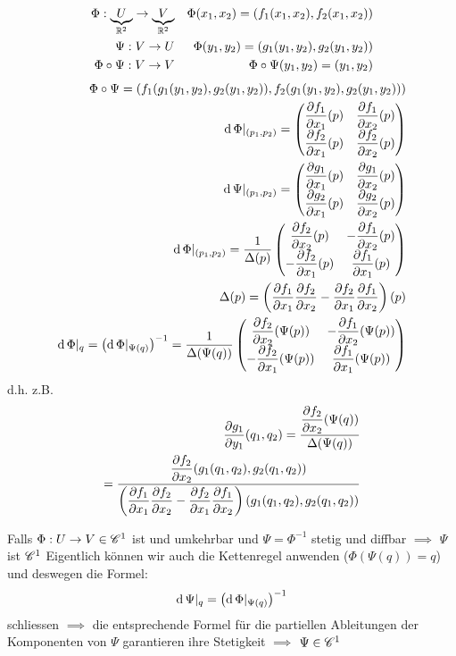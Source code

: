 \begin{Bsp}
  \begin{align*}
    \Phi:\underbrace{U}_{\mathbb{R}^{2}}\rightarrow\underbrace{V}_{\mathbb{R}^{2}} &&\Phi(x_1,x_2)=(f_1(x_1,x_2),f_2(x_1,x_2))\\
    \Psi:V\rightarrow U && \Phi(y_1,y_2)=(g_1(y_1,y_2),g_2(y_1,y_2))\\
    \Phi\circ\Psi:V\rightarrow V&&\Phi\circ\Psi(y_1,y_2)=(y_1,y_2)\\
  \end{align*}
  \begin{eqnarray*}
    \Phi\circ\Psi=(f_1(g_1(y_1,y_2),g_2(y_1,y_2)),f_2(g_1(y_1,y_2),g_2(y_1,y_2)))\\
    \operatorname{d}\Phi|_{(p_1,p_2)}= \begin{pmatrix}
      \dfrac{\partial f_1}{\partial x_1}(p) & \dfrac{\partial f_1}{\partial x_2}(p)\\
      \dfrac{\partial f_2}{\partial x_1}(p) & \dfrac{\partial f_2}{\partial x_2}(p)
    \end{pmatrix}\\
    \operatorname{d}\Psi|_{(p_1,p_2)}= \begin{pmatrix}
      \dfrac{\partial g_1}{\partial x_1}(p) & \dfrac{\partial g_1}{\partial x_2}(p)\\
      \dfrac{\partial g_2}{\partial x_1}(p) & \dfrac{\partial g_2}{\partial x_2}(p)
    \end{pmatrix}\\
    \operatorname{d}\Phi|_{(p_1,p_2)}= \frac{1}{\Delta(p)}\begin{pmatrix}
      \dfrac{\partial f_2}{\partial x_2}(p) & -\dfrac{\partial f_1}{\partial x_2}(p)\\
      -\dfrac{\partial f_2}{\partial x_1}(p) & \dfrac{\partial f_1}{\partial x_1}(p)
    \end{pmatrix}\\
    \Delta(p)= \left( \dfrac{\partial f_1}{\partial x_1} \dfrac{\partial f_2}{\partial x_2} -\dfrac{\partial f_2}{\partial x_1} \dfrac{\partial f_1}{\partial x_2} \right)(p)\\
    \operatorname{d}\Phi|_q=\left( \operatorname{d}\Phi|_{\Psi(q)} \right)^{-1}=\frac{1}{\Delta(\Psi(q))}\begin{pmatrix}
      \dfrac{\partial f_2}{\partial x_2}(\Psi(p)) & -\dfrac{\partial f_1}{\partial x_2}(\Psi(p))\\
      -\dfrac{\partial f_2}{\partial x_1}(\Psi(p)) & \dfrac{\partial f_1}{\partial x_1}(\Psi(p))
    \end{pmatrix}
  \end{eqnarray*}
  d.h. z.B.
  \begin{eqnarray*}
    \dfrac{\partial g_1}{\partial y_1}(q_1,q_2)=\frac{\dfrac{\partial f_2}{\partial x_2}(\Psi(q))}{\Delta(\Psi(q))}\\
    =\frac{\dfrac{\partial f_2}{\partial x_2}(g_1(q_1,q_2),g_2(q_1,q_2))}{\left( \dfrac{\partial f_1}{\partial x_1} \dfrac{\partial f_2}{\partial x_2} -\dfrac{\partial f_2}{\partial x_1} \dfrac{\partial f_1}{\partial x_2} \right)(g_1(q_1,q_2),g_2(q_1,q_2))}
  \end{eqnarray*}
\end{Bsp}
\begin{Bem}
  Falls $\Phi:U\rightarrow V\in\mathscr{C}^1$ ist und umkehrbar und $\Psi=\Phi^{-1}$ stetig und diffbar $\implies$ $\Psi$ ist $\mathscr{C}^1$ Eigentlich können wir auch die Kettenregel anwenden ($\Phi(\Psi(q))=q$) und deswegen die Formel:
  \[\operatorname{d}\Psi|_q=\left( \operatorname{d}\Phi|_{\Psi(q)} \right)^{-1}\]
  schliessen $\implies$ die entsprechende Formel für die partiellen Ableitungen der Komponenten von $\Psi$ garantieren ihre Stetigkeit $\implies$ $\Psi\in\mathscr{C}^1$
\end{Bem}
